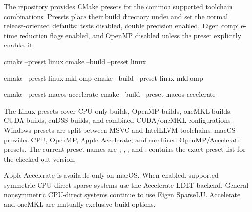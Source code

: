The repository provides CMake presets for the common supported toolchain combinations. Presets place their build directory under  and set the normal release-oriented defaults: tests disabled, double precision enabled, Eigen compile-time reduction flags enabled, and OpenMP disabled unless the preset explicitly enables it.

\begin{shellcmd}
cmake --preset linux
cmake --build --preset linux

cmake --preset linux-mkl-omp
cmake --build --preset linux-mkl-omp

cmake --preset macos-accelerate
cmake --build --preset macos-accelerate
\end{shellcmd}

The Linux presets cover CPU-only builds, OpenMP builds, oneMKL builds, CUDA builds, cuDSS builds, and combined CUDA/oneMKL configurations. Windows presets are split between MSVC and IntelLLVM toolchains. macOS provides CPU, OpenMP, Apple Accelerate, and combined OpenMP/Accelerate presets. The current preset names are , , , and .  contains the exact preset list for the checked-out version.

Apple Accelerate is available only on macOS. When enabled, supported symmetric CPU-direct sparse systems use the Accelerate LDLT backend. General nonsymmetric CPU-direct systems continue to use Eigen SparseLU. Accelerate and oneMKL are mutually exclusive build options.

